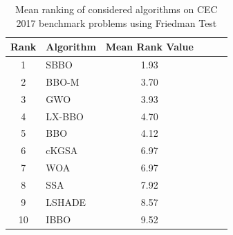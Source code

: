 \begin{table}
\caption[Mean ranking of considered algorithms on CEC 2017 benchmark problems using Friedman Test]{\fontsize{10pt}{12pt}\selectfont Mean ranking of considered algorithms on CEC 2017 benchmark problems using Friedman Test}
\centering 
\scriptsize
{\renewcommand{\arraystretch}{1.3}
\begin{tabular}{ cl cl cl}
\hline
\textbf{Rank} &   \textbf{Algorithm} & \textbf{Mean Rank Value}\\
\hline
1    &    SBBO    &    1.93    \\
2    &    BBO-M    &    3.70    \\
3    &    GWO    &    3.93    \\
4    &    LX-BBO   &    4.70    \\
5    &    BBO    &    4.12    \\
6    &    cKGSA    &    6.97    \\
7    &    WOA    &    6.97    \\
8    &    SSA    &    7.92    \\
9    &    LSHADE    &    8.57\\
10    &    IBBO    &    9.52    \\


\hline
\end{tabular}}
\label{tab:rankTest2}

\end{table}




